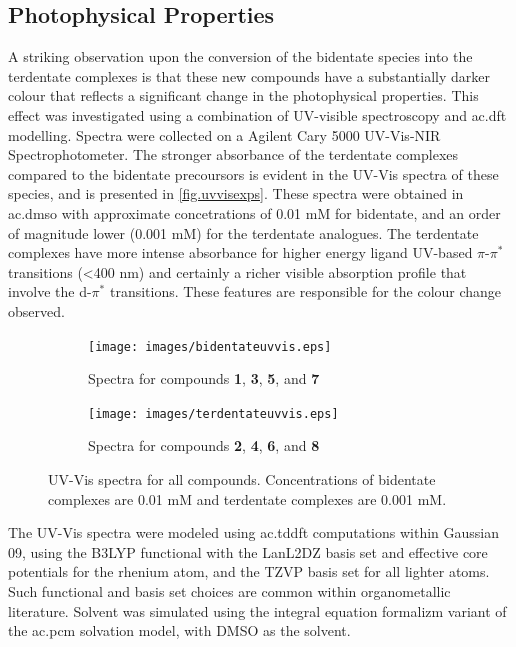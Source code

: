 \subsection{Photophysical Properties}

A striking observation upon the conversion of the bidentate species into the terdentate complexes is that these new compounds have a substantially darker colour that reflects a significant change in the photophysical properties. This effect was investigated using a combination of UV-visible spectroscopy and \gls{ac.dft} modelling. Spectra were collected on a Agilent Cary 5000 UV-Vis-NIR Spectrophotometer. The stronger absorbance of the terdentate complexes compared to the bidentate precoursors is evident in the UV-Vis spectra of these species, and is presented in \autoref{fig.uvvisexps}. These spectra were obtained in \gls{ac.dmso} with approximate concetrations of 0.01 mM for bidentate, and an order of magnitude lower (0.001 mM) for the terdentate analogues. The terdentate complexes have more intense absorbance for higher energy ligand UV-based $\pi$-$\pi^\ast$ transitions (\textless 400 nm) and certainly a richer visible absorption profile that involve the d-$\pi^\ast$ transitions. These features are responsible for the colour change observed.

\begin{figure}[!htb]
 \centering
 \begin{subfigure}[b]{0.49\textwidth}
  \texttt{[image: images/bidentateuvvis.eps]}
  \caption{Spectra for compounds \textbf{1}, \textbf{3}, \textbf{5}, and \textbf{7}}
  \label{fig.uvvisbids}
 \end{subfigure}
 \begin{subfigure}[b]{0.49\textwidth}
  \texttt{[image: images/terdentateuvvis.eps]}
  \caption{Spectra for compounds \textbf{2}, \textbf{4}, \textbf{6}, and \textbf{8}}
  \label{fig.uvvisters}
 \end{subfigure}
\caption[UV-Vis spectra for all compounds]{UV-Vis spectra for all compounds. Concentrations of bidentate complexes are 0.01 mM and terdentate complexes are 0.001 mM.}
\label{fig.uvvisexps}
\end{figure} 

The UV-Vis spectra were modeled using \gls{ac.tddft} computations within Gaussian 09, using the B3LYP functional with the LanL2DZ basis set and effective core potentials for the rhenium atom, and the TZVP basis set for all lighter atoms. Such functional and basis set choices are common within organometallic literature. Solvent was simulated using the integral equation formalizm variant of the \gls{ac.pcm} solvation model, with DMSO as the solvent. 

